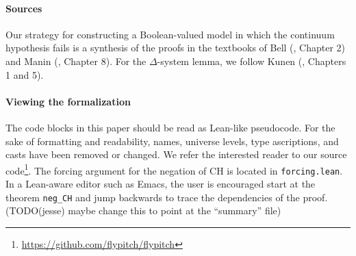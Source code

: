 \documentclass[a4paper,USenglish,cleveref, autoref]{lipics-v2019}
\newcommand{\B}{\mathbb{B}}
\theoremstyle{definition}
\begin{document}

\paragraph*{Sources}
Our strategy for constructing a Boolean-valued model in which the continuum hypothesis fails is a synthesis of the proofs in the textbooks of Bell (\cite{bell1}, Chapter 2) and Manin (\cite{manin1}, Chapter 8). For the $\Delta$-system lemma, we follow Kunen (\cite{kunen1}, Chapters 1 and 5).

\paragraph*{Viewing the formalization}
The code blocks in this paper should be read as Lean-like pseudocode. For the sake of formatting and readability, names, universe levels, type ascriptions, and casts have been removed or changed. We refer the interested reader to our source code\footnote{\url{https://github.com/flypitch/flypitch}}. The forcing argument for the negation of CH is located in \lstinline{forcing.lean}. In a Lean-aware editor such as Emacs, the user is encouraged start at the theorem \lstinline{neg_CH} and jump backwards to trace the dependencies of the proof. (TODO(jesse) maybe change this to point at the ``summary'' file)
\end{document}
